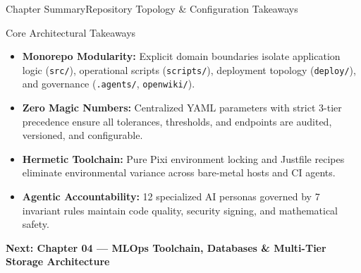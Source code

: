 \begin{frame}{Chapter Summary}{Repository Topology \& Configuration Takeaways}
    \begin{block}{Core Architectural Takeaways}
        \begin{itemize}\small
            \item \textbf{Monorepo Modularity:} Explicit domain boundaries isolate application logic (\texttt{src/}), operational scripts (\texttt{scripts/}), deployment topology (\texttt{deploy/}), and governance (\texttt{.agents/}, \texttt{openwiki/}).
            \item \textbf{Zero Magic Numbers:} Centralized YAML parameters with strict 3-tier precedence ensure all tolerances, thresholds, and endpoints are audited, versioned, and configurable.
            \item \textbf{Hermetic Toolchain:} Pure Pixi environment locking and Justfile recipes eliminate environmental variance across bare-metal hosts and CI agents.
            \item \textbf{Agentic Accountability:} 12 specialized AI personas governed by 7 invariant rules maintain code quality, security signing, and mathematical safety.
        \end{itemize}
    \end{block}

    \vspace{0.2cm}
    \begin{center}
        \textcolor{deepblue}{\textbf{Next: Chapter 04 --- MLOps Toolchain, Databases \& Multi-Tier Storage Architecture}}
    \end{center}

\end{frame}
